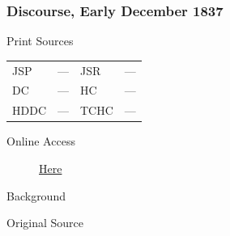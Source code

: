 		\subsubsection{Discourse, Early December 1837}
			\label{EMS-1837-JS-DEC-1837}
			
			\begin{description}
					\item[Print Sources]
				\end{description}

					\begin{tabular}{p{0.5in}p{1in}p{0.5in}p{1in}}
					JSP	 	& ---		& JSR 		& --- \\
					DC	 	& ---		& HC 		& --- \\
					HDDC 	& ---		& TCHC 		& --- \\
					\end{tabular}
				
				\begin{description}
					\item[Online Access] \href{https://www.josephsmithpapers.org/paper-summary/discourse-early-december-1837/1}{Here}
				\end{description}
				
				\begin{description}
					\item[Background]
				\end{description}
				
				
				\begin{description}
					\item[Original Source]
				\end{description}
				
				

